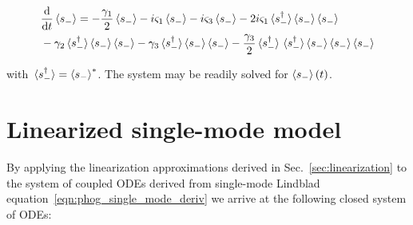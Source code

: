 \begin{align}
&\ddt \ev{s_-} = - \frac{\gamma_1}{2} \ev{s_-} - i \varsigma_1 \ev{s_-} - i \varsigma_3 \ev{s_-} - 2 i \varsigma_1 \ev*{s_-^\dagger} \ev{s_-} \ev{s_-}  \notag \\
%
&- \gamma_2 \ev*{s_-^\dagger} \ev{s_-} \ev{s_-} - \gamma_3 \ev*{s_-^\dagger} \ev{s_-} \ev{s_-} - \frac{\gamma_3}{2} \ev*{s_-^\dagger} \ev*{s_-^\dagger} \ev{s_-} \ev{s_-} \ev{s_-}
\end{align}

\noindent with $\ev*{s_-^\dagger} = \ev{s_-}^*$. The system may be readily solved for $\ev{s_-}\left(t\right)$.

\section{Linearized single-mode model}\label{appendix:single_mode_linear}
By applying the linearization approximations derived in Sec.~\ref{sec:linearization} to the system of coupled ODEs derived from single-mode Lindblad equation~\ref{eqn:phog_single_mode_deriv} we arrive at the following closed system of ODEs:


